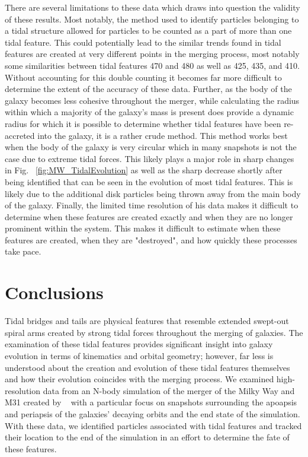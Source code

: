 \documentclass[fleqn,usenatbib]{mnras}
\begin{document}
There are several limitations to these data which draws into question the validity of these results. Most notably, the method used to identify particles belonging to a tidal structure allowed for particles to be counted as a part of more than one tidal feature. This could potentially lead to the similar trends found in tidal features are created at very different points in the merging process, most notably some similarities between tidal features 470 and 480 as well as 425, 435, and 410. Without accounting for this double counting it becomes far more difficult to determine the extent of the accuracy of these data. Further, as the body of the galaxy becomes less cohesive throughout the merger, while calculating the radius within which a majority of the galaxy's mass is present does provide a dynamic radius for which it is possible to determine whether tidal features have been re-accreted into the galaxy, it is a rather crude method. This method works best when the body of the galaxy is very circular which in many snapshots is not the case due to extreme tidal forces. This likely plays a major role in sharp changes in Fig. ~\ref{fig:MW_TidalEvolution} as well as the sharp decrease shortly after being identified that can be seen in the evolution of most tidal features. This is likely due to the additional disk particles being thrown away from the main body of the galaxy. Finally, the limited time resolution of his data makes it difficult to determine when these features are created exactly and when they are no longer prominent within the system. This makes it difficult to estimate when these features are created, when they are "destroyed", and how quickly these processes take pace.

\section{Conclusions}

Tidal bridges and tails are physical features that resemble extended swept-out spiral arms created by strong tidal forces throughout the merging of galaxies. The examination of these tidal features provides significant insight into galaxy evolution in terms of kinematics and orbital geometry; however, far less is understood about the creation and evolution of these tidal features themselves and how their evolution coincides with the merging process. We examined high-resolution data from an N-body simulation of the merger of the Milky Way and M31 created by ~\cite{van_der_Marel_Besla_2012} with a particular focus on snapshots surrounding the apoapsis and periapsis of the galaxies' decaying orbits and the end state of the simulation. With these data, we identified particles associated with tidal features and tracked their location to the end of the simulation in an effort to determine the fate of these features.
\end{document}
